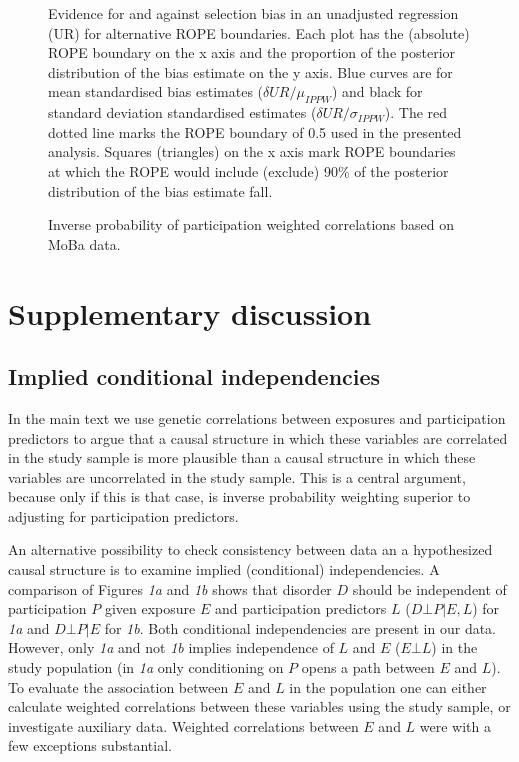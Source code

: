 \documentclass[12pt]{article}
\begin{document}
\begin{figure}[H]
	\centering 
	\caption{Evidence for and against selection bias in an unadjusted regression (UR) for alternative ROPE boundaries. Each plot has the (absolute) ROPE boundary on the x axis and the proportion of the posterior distribution of the bias estimate on the y axis. Blue curves are for mean standardised bias estimates ($\delta{UR}/\mu_{IPPW}$) and black for standard deviation standardised estimates ($\delta{UR}/\sigma_{IPPW}$). The red dotted line marks the ROPE boundary of 0.5 used in the presented analysis. Squares (triangles) on the x axis mark ROPE boundaries at which the ROPE would include (exclude) 90\% of the posterior distribution of the bias estimate fall.}
	\label{fig:ropeplotsUR}
\end{figure}

\begin{figure}[H]
	\centering 
	\caption{Inverse probability of participation weighted correlations based on MoBa data.}
	\label{fig:educors}
\end{figure}

\newpage

\section{Supplementary discussion}
\subsection{Implied conditional independencies}
In the main text we use genetic correlations between exposures and participation predictors to argue that a causal structure in which these variables are correlated in the study sample is more plausible than a causal structure in which these variables are uncorrelated in the study sample. This is a central argument, because only if this is that case, is inverse probability weighting  superior to adjusting for participation predictors.

An alternative possibility to check consistency between data an a hypothesized causal structure is to examine implied (conditional) independencies. A comparison of Figures \emph{1a} and \emph{1b} shows that disorder $D$ should be independent of participation $P$ given exposure $E$ and participation predictors $L$ ($D \bot P|E,L$) for \emph{1a} and $D \bot P | E$ for \emph{1b}. Both conditional independencies are present in our data. However, only \emph{1a} and not \emph{1b} implies independence of $L$ and $E$ ($E \bot L$) in the study population (in \emph{1a} only conditioning on $P$ opens a path between $E$ and $L$). To evaluate the association between $E$ and $L$ in the population one can either calculate weighted correlations between these variables using the study sample, or investigate auxiliary data. Weighted correlations between $E$ and $L$ were with a few exceptions substantial. 
\end{document}
